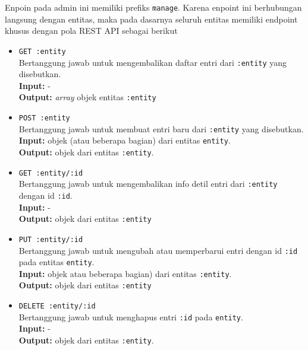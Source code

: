     Enpoin pada admin ini memiliki prefiks \texttt{manage}. Karena enpoint ini
    berhubungan langsung dengan entitas, maka pada dasarnya seluruh entitas
    memiliki endpoint khusus dengan pola REST API sebagai berikut
    \begin{itemize}
        \item \texttt{GET :entity} \\
            Bertanggung jawab untuk mengembalikan daftar entri dari
            \texttt{:entity} yang disebutkan.\\
            \textbf{Input:} -\\
            \textbf{Output:} \textit{array} objek entitas \texttt{:entity}
            
        \item \texttt{POST :entity} \\
            Bertanggung jawab untuk membuat entri baru dari \texttt{:entity}
            yang disebutkan.\\
            \textbf{Input:} objek (atau beberapa bagian) dari entitas
                \texttt{\:entity}.\\
            \textbf{Output:} objek dari entitas \texttt{:entity}.
            
        \item \texttt{GET :entity/:id} \\
            Bertanggung jawab untuk mengembalikan info detil entri dari
            \texttt{:entity} dengan id \texttt{:id}.\\
            \textbf{Input:} -\\
            \textbf{Output:} objek dari entitas \texttt{:entity}
            
        \item \texttt{PUT :entity/:id} \\
            Bertanggung jawab untuk mengubah atau memperbarui entri dengan id
            \texttt{:id} pada entitas \texttt{entity}.\\
            \textbf{Input:} objek atau beberapa bagian) dari entitas
                \texttt{:entity}.\\
            \textbf{Output:} objek dari entitas \texttt{:entity}
        
        \item \texttt{DELETE :entity/:id} \\
            Bertanggung jawab untuk menghapus entri \texttt{:id} pada
            \texttt{entity}.\\
            \textbf{Input:} -\\
            \textbf{Output:} objek dari entitas \texttt{:entity}.
    \end{itemize}
    

